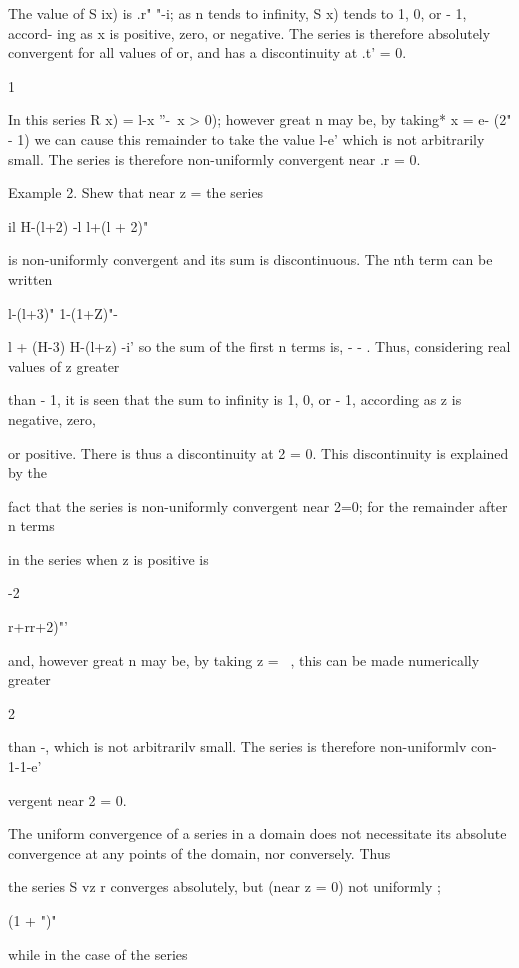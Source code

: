 The value of S ix) is .r" "-i; as n tends to infinity, S x) tends to
1, 0, or - 1, accord- ing as x is positive, zero, or negative. The
series is therefore absolutely convergent for all values of or, and
has a discontinuity at .t' = 0.

%
%

1

In this series R x) = l-x ''-\ x > 0); however great n may be, by
taking* x = e- (2" - 1) we can cause this remainder to take the value
l-e' which is not arbitrarily small. The series is therefore
non-uniformly convergent near .r = 0.

Example 2. Shew that near z = the series

 il H-(l+2) -l l+(l + 2)"

is non-uniformly convergent and its sum is discontinuous. The nth term
can be written

l-(l+3)" 1-(1+Z)"-

l + (H-3) H-(l+z) -i' so the sum of the first n terms is, - - . Thus,
considering real values of z greater

than - 1, it is seen that the sum to infinity is 1, 0, or - 1,
according as z is negative, zero,

or positive. There is thus a discontinuity at 2 = 0. This
discontinuity is explained by the

fact that the series is non-uniformly convergent near 2=0; for the
remainder after n terms

in the series when z is positive is

-2

r+rr+2)"'

and, however great n may be, by taking z = ~, this can be made
numerically greater

2

than -, which is not arbitrarilv small. The series is therefore
non-uniformlv con- 1-1-e'

vergent near 2 = 0.


The uniform convergence of a series in a domain does not necessitate
its absolute convergence at any points of the domain, nor conversely.
Thus

the series S vz r converges absolutely, but (near z = 0) not uniformly
;

(1 + ")"

while in the case of the series

